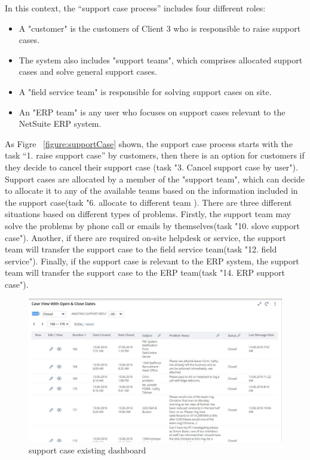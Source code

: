 In this context, the “support case process” includes four different roles:
\begin{itemize}

\item A "customer" is the customers of Client 3 who is responsible to raise support cases.
\item The system also includes "support teams", which comprises allocated support cases and solve general support cases.
\item A "field service team" is responsible for solving support cases on site.
\item An "ERP team" is any user who focuses on support cases relevant to the NetSuite ERP system.
\end{itemize}

As Figre ~\ref{figure:supportCase} shown, the support case process starts with the task “1. raise support case” by customers, then there is an option for customers if they decide to cancel their support case (task "3. Cancel support case by user"). Support cases are allocated by a member of the "support team", which can decide to allocate it to any of the available teams based on the information included in the support case(task "6. allocate to different team ). There are three different situations based on different types of problems. Firstly, the support team may solve the problems by phone call or emails by themselves(task "10. slove support case"). Another, if there are required on-site helpdesk or service, the support team will transfer the support case to the field service team(task "12. field service"). Finally, if the support case is relevant to the ERP system, the support team will transfer the support case to the ERP team(task "14. ERP support case").

\begin{figure}[!htb]
    \centering 
    \includegraphics[scale=0.5]{resource/supportcaseHCS.JPG}
    \caption{support case existing dashboard}
    \label{figure:supportCaseHCS}
\end{figure}


